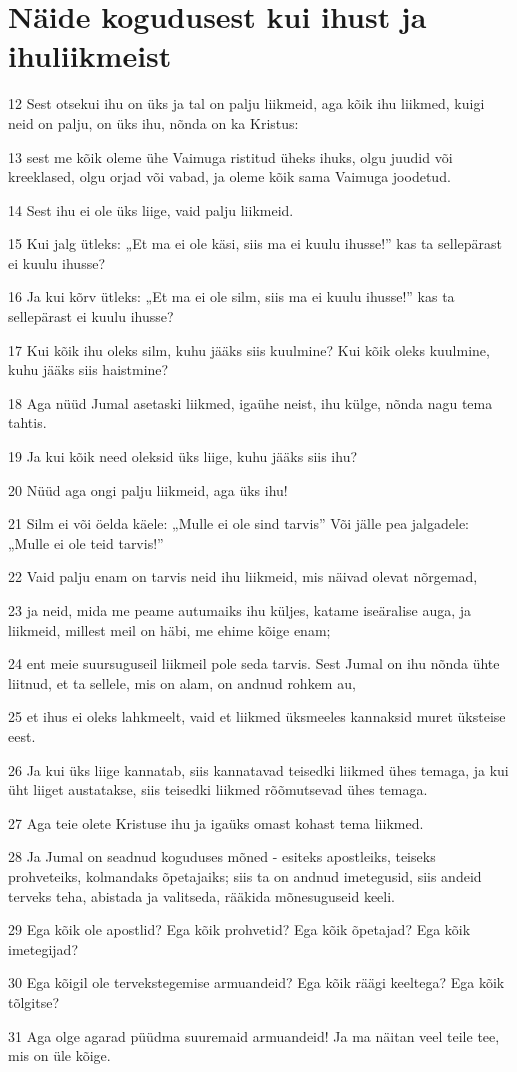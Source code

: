 \section*{Näide kogudusest kui ihust ja ihuliikmeist}

\par 12 Sest otsekui ihu on üks ja tal on palju liikmeid, aga kõik ihu liikmed, kuigi neid on palju, on üks ihu, nõnda on ka Kristus:
\par 13 sest me kõik oleme ühe Vaimuga ristitud üheks ihuks, olgu juudid või kreeklased, olgu orjad või vabad, ja oleme kõik sama Vaimuga joodetud.
\par 14 Sest ihu ei ole üks liige, vaid palju liikmeid.
\par 15 Kui jalg ütleks: „Et ma ei ole käsi, siis ma ei kuulu ihusse!” kas ta sellepärast ei kuulu ihusse?
\par 16 Ja kui kõrv ütleks: „Et ma ei ole silm, siis ma ei kuulu ihusse!” kas ta sellepärast ei kuulu ihusse?
\par 17 Kui kõik ihu oleks silm, kuhu jääks siis kuulmine? Kui kõik oleks kuulmine, kuhu jääks siis haistmine?
\par 18 Aga nüüd Jumal asetaski liikmed, igaühe neist, ihu külge, nõnda nagu tema tahtis.
\par 19 Ja kui kõik need oleksid üks liige, kuhu jääks siis ihu?
\par 20 Nüüd aga ongi palju liikmeid, aga üks ihu!
\par 21 Silm ei või öelda käele: „Mulle ei ole sind tarvis” Või jälle pea jalgadele: „Mulle ei ole teid tarvis!”
\par 22 Vaid palju enam on tarvis neid ihu liikmeid, mis näivad olevat nõrgemad,
\par 23 ja neid, mida me peame autumaiks ihu küljes, katame iseäralise auga, ja liikmeid, millest meil on häbi, me ehime kõige enam;
\par 24 ent meie suursuguseil liikmeil pole seda tarvis. Sest Jumal on ihu nõnda ühte liitnud, et ta sellele, mis on alam, on andnud rohkem au,
\par 25 et ihus ei oleks lahkmeelt, vaid et liikmed üksmeeles kannaksid muret üksteise eest.
\par 26 Ja kui üks liige kannatab, siis kannatavad teisedki liikmed ühes temaga, ja kui üht liiget austatakse, siis teisedki liikmed rõõmutsevad ühes temaga.
\par 27 Aga teie olete Kristuse ihu ja igaüks omast kohast tema liikmed.
\par 28 Ja Jumal on seadnud koguduses mõned - esiteks apostleiks, teiseks prohveteiks, kolmandaks õpetajaiks; siis ta on andnud imetegusid, siis andeid terveks teha, abistada ja valitseda, rääkida mõnesuguseid keeli.
\par 29 Ega kõik ole apostlid? Ega kõik prohvetid? Ega kõik õpetajad? Ega kõik imetegijad?
\par 30 Ega kõigil ole tervekstegemise armuandeid? Ega kõik räägi keeltega? Ega kõik tõlgitse?
\par 31 Aga olge agarad püüdma suuremaid armuandeid! Ja ma näitan veel teile tee, mis on üle kõige.


